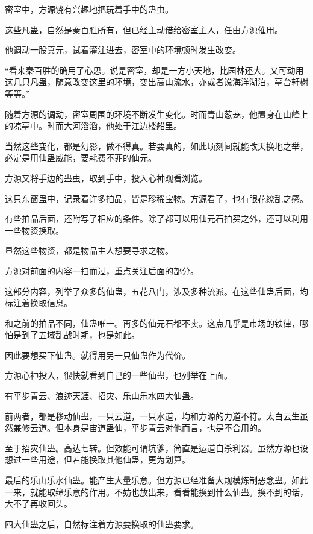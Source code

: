 
\begin{this_body}

密室中，方源饶有兴趣地把玩着手中的蛊虫。

这些凡蛊，自然是秦百胜所有，但已经主动借给密室主人，任由方源催用。

他调动一股真元，试着灌注进去，密室中的环境顿时发生改变。

“看来秦百胜的确用了心思。说是密室，却是一方小天地，比园林还大。又可动用这几只凡蛊，随意改变这里的环境，变出高山流水，亦或者说海洋湖泊，亭台轩榭等等。”

随着方源的调动，密室周围的环境不断发生变化。时而青山葱茏，他置身在山峰上的凉亭中。时而大河滔滔，他处于江边楼船里。

当然这些变化，都是幻影，做不得真。若要真的，如此顷刻间就能改天换地之举，必定是用仙蛊威能，要耗费不菲的仙元。

方源又将手边的蛊虫，取到手中，投入心神观看浏览。

这只东窗蛊中，记录着许多拍品，皆是珍稀宝物。方源看了，也有眼花缭乱之感。

有些拍品后面，还附写了相应的条件。除了都可以用仙元石拍买之外，还可以利用一些物资换取。

显然这些物资，都是物品主人想要寻求之物。

方源对前面的内容一扫而过，重点关注后面的部分。

这部分内容，列举了众多的仙蛊，五花八门，涉及多种流派。在这些仙蛊后面，均标注着换取信息。

和之前的拍品不同，仙蛊唯一。再多的仙元石都不卖。这点几乎是市场的铁律，哪怕是到了五域乱战时期，也是如此。

因此要想买下仙蛊。就得用另一只仙蛊作为代价。

方源心神投入，很快就看到自己的一些仙蛊，也列举在上面。

有平步青云、浪迹天涯、招灾、乐山乐水四大仙蛊。

前两者，都是移动仙蛊，一只云道，一只水道，均和方源的力道不符。太白云生虽然兼修云道。但本身是宙道蛊仙，平步青云对他而言，也是不合用的。

至于招灾仙蛊。高达七转。但效能可谓坑爹，简直是运道自杀利器。虽然方源也设想过一些用途，但若能换取其他仙蛊，更为划算。

最后的乐山乐水仙蛊。能产生大量乐意。但方源已经准备大规模炼制恶念蛊。如此一来，就能取缔乐意的作用。不妨也放出来，看看能换到什么仙蛊。换不到的话，大不了再收回头。

四大仙蛊之后，自然标注着方源要换取的仙蛊要求。


\end{this_body}
